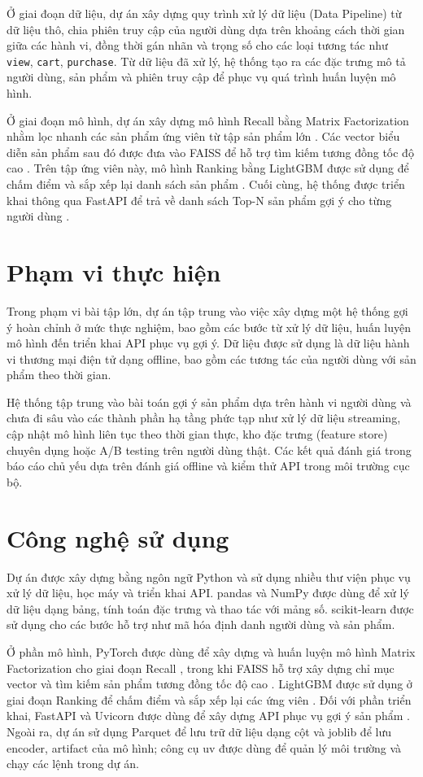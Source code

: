 Ở giai đoạn dữ liệu, dự án xây dựng quy trình xử lý dữ liệu (Data Pipeline) từ dữ liệu thô, chia phiên truy cập của người dùng dựa trên khoảng cách thời gian giữa các hành vi, đồng thời gán nhãn và trọng số cho các loại tương tác như \colorbox{gray!15}{\texttt{view}}, \colorbox{gray!15}{\texttt{cart}}, \colorbox{gray!15}{\texttt{purchase}}. Từ dữ liệu đã xử lý, hệ thống tạo ra các đặc trưng mô tả người dùng, sản phẩm và phiên truy cập để phục vụ quá trình huấn luyện mô hình.
\medskip

Ở giai đoạn mô hình, dự án xây dựng mô hình Recall bằng Matrix Factorization nhằm lọc nhanh các sản phẩm ứng viên từ tập sản phẩm lớn \cite{koren2009matrix}. Các vector biểu diễn sản phẩm sau đó được đưa vào FAISS để hỗ trợ tìm kiếm tương đồng tốc độ cao \cite{johnson2019billion}. Trên tập ứng viên này, mô hình Ranking bằng LightGBM được sử dụng để chấm điểm và sắp xếp lại danh sách sản phẩm \cite{ke2017lightgbm}. Cuối cùng, hệ thống được triển khai thông qua FastAPI để trả về danh sách Top-N sản phẩm gợi ý cho từng người dùng \cite{fastapi2026docs}.

\section{Phạm vi thực hiện}
Trong phạm vi bài tập lớn, dự án tập trung vào việc xây dựng một hệ thống gợi ý hoàn chỉnh ở mức thực nghiệm, bao gồm các bước từ xử lý dữ liệu, huấn luyện mô hình đến triển khai API phục vụ gợi ý. Dữ liệu được sử dụng là dữ liệu hành vi thương mại điện tử dạng offline, bao gồm các tương tác của người dùng với sản phẩm theo thời gian.
\medskip

Hệ thống tập trung vào bài toán gợi ý sản phẩm dựa trên hành vi người dùng và chưa đi sâu vào các thành phần hạ tầng phức tạp như xử lý dữ liệu streaming, cập nhật mô hình liên tục theo thời gian thực, kho đặc trưng (feature store) chuyên dụng hoặc A/B testing trên người dùng thật. Các kết quả đánh giá trong báo cáo chủ yếu dựa trên đánh giá offline và kiểm thử API trong môi trường cục bộ.

\section{Công nghệ sử dụng}
Dự án được xây dựng bằng ngôn ngữ Python và sử dụng nhiều thư viện phục vụ xử lý dữ liệu, học máy và triển khai API. pandas và NumPy được dùng để xử lý dữ liệu dạng bảng, tính toán đặc trưng và thao tác với mảng số. scikit-learn được sử dụng cho các bước hỗ trợ như mã hóa định danh người dùng và sản phẩm.
\medskip

Ở phần mô hình, PyTorch được dùng để xây dựng và huấn luyện mô hình Matrix Factorization cho giai đoạn Recall \cite{paszke2019pytorch}, trong khi FAISS hỗ trợ xây dựng chỉ mục vector và tìm kiếm sản phẩm tương đồng tốc độ cao \cite{johnson2019billion}. LightGBM được sử dụng ở giai đoạn Ranking để chấm điểm và sắp xếp lại các ứng viên \cite{ke2017lightgbm}. Đối với phần triển khai, FastAPI và Uvicorn được dùng để xây dựng API phục vụ gợi ý sản phẩm \cite{fastapi2026docs}. Ngoài ra, dự án sử dụng Parquet để lưu trữ dữ liệu dạng cột \cite{apacheparquet2026docs} và joblib để lưu encoder, artifact của mô hình; công cụ uv được dùng để quản lý môi trường và chạy các lệnh trong dự án.
